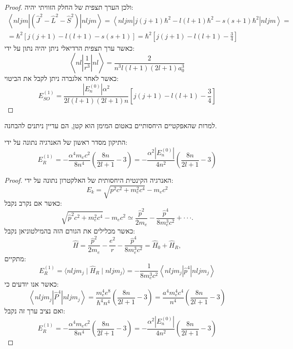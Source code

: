 \documentclass{tstextbook}
\begin{document}
\begin{proof}
ולכן הערך תצפית של החלק הזוויתי יהיה:
\begin{gather*}\left\langle n l j m\left|\left( \hat{J}^{2}-\hat{L}^{2}-\hat{S}^{2} \right)\right|n l j m\right\rangle=\left\langle  n l j m|j(j+1)\hbar^{2}-l(l+1)\hbar^{2}-s(s+1)\hbar^{2}|n l j m \right\rangle =\\=\hbar^{2}[j(j+1)-l(l+1)-s(s+1)]=\hbar^{2}\left[ j(j+1)-l(l+1)-\frac{3}{4} \right] 
\end{gather*}
כאשר ערך תצפית הרדיאלי ניתן יהיה נתון על ידי:
$$\left\langle n l\left|\frac{1}{r^{3}}\right|n l\right\rangle=\frac{2}{n^{3}l(l+1)(2l+1)a_{0}^{3}}$$
כאשר לאחר אלגברה ניתן לקבל את הביטוי:
$$E_{S O}^{(1)}=\frac{|E_{n}^{(0)}|\alpha^{2}}{2l(l+1)(2l+1)n}\left[j(j+1)-l(l+1)-\frac{3}{4}\right]$$

\end{proof}
\begin{definition}
למרות שהאפקטיים היחסותיים באטום המימן הוא קטן, הם עדיין ניתנים להבחנה.

\end{definition}
\begin{proposition}
התיקון מסדר ראשון של האנרגיה נתונה על ידי:
$$E_{R}^{(1)}=-\frac{\alpha^{4}m_{e}c^{2}}{8n^{4}}\left(\frac{8n}{2l+1}-3\right)=-\frac{\alpha^{2}|E_{n}^{(0)}|}{4n^{2}}\left(\frac{8n}{2l+1}-3\right)$$

\end{proposition}
\begin{proof}
האנרגיה הקינטית היחסותית של האלקטרון נתונה על ידי:
$$E_{k}=\sqrt{ p^{2}c^{2}+m_{e}^{2}c^{4} }-m_{e}c^{2}$$
כאשר אם נקרב נקבל:
$$\sqrt{\hat{p}^{2}c^{2}+m_{e}^{2}c^{4}}-m_{e}c^{2}\simeq\frac{\hat{p}^{2}}{2m_{e}}-\frac{\hat{p}^{4}}{8m_{e}^{3}c^{2}}+\cdot\cdot\cdot.$$
כאשר מכלילים את הגורם הזה בהמילטוניאן נקבל:
$$\hat{H}=\frac{\hat{p}^{2}}{2m_{e}}-\frac{e^{2}}{r}-\frac{\hat{p}^{4}}{8m_{e}^{3}c^{2}}=\hat{H}_{0}+\hat{H}_{R},$$
מתקיים:
$$E_{R}^{(1)}=\langle n l j m_{j}\mid\hat{H}_{R}\mid n l j m_{j}\rangle=-\frac{1}{8m_{e}^{3}c^{2}}\left\langle n l j m_{j}\left|\hat{p}^{4}\right|n l j m_{j}\right\rangle$$
כאשר אנו יודעים כי:
$$\left\langle n l j m_{j}\left|\hat{P}^{4}\right|n l j m_{j}\right\rangle=\frac{m_{e}^{4}e^{8}}{\hbar^{4}n^{4}}\left(\frac{8n}{2l+1}-3\right)=\frac{a^{4}m_{e}^{4}c^{4}}{n^{4}}\left(\frac{8n}{2l+1}-3\right)$$
ואם נציב ערך זה נקבל:
$$E_{R}^{(1)}=-\frac{\alpha^{4}m_{e}c^{2}}{8n^{4}}\left(\frac{8n}{2l+1}-3\right)=-\frac{\alpha^{2}|E_{n}^{(0)}|}{4n^{2}}\left(\frac{8n}{2l+1}-3\right)$$

\end{proof}
\end{document}

